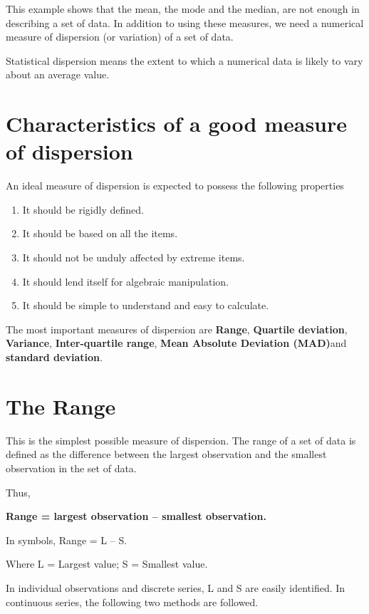 \documentclass[
]{book}
\begin{document}
This example shows that the mean, the mode and the median, are not
enough in describing a set of data. In addition to using these measures,
we need a numerical measure of dispersion (or variation) of a set of
data.

Statistical dispersion means the extent to which a numerical data is
likely to vary about an average value.

\section{Characteristics of a good measure of dispersion}\label{characteristics-of-a-good-measure-of-dispersion}

An ideal measure of dispersion is expected to possess the following
properties

\begin{enumerate}
\def\labelenumi{\arabic{enumi}.}
\item
  It should be rigidly defined.
\item
  It should be based on all the items.
\item
  It should not be unduly affected by extreme items.
\item
  It should lend itself for algebraic manipulation.
\item
  It should be simple to understand and easy to calculate.
\end{enumerate}

The most important measures of dispersion are \textbf{Range}, \textbf{Quartile
deviation}, \textbf{Variance}, \textbf{Inter-quartile range}, \textbf{Mean Absolute
Deviation (MAD)}and \textbf{standard deviation}.

\section{The Range}\label{the-range}

This is the simplest possible measure of dispersion. The range of a set
of data is defined as the difference between the largest observation and
the smallest observation in the set of data.

Thus,

\textbf{Range = largest observation -- smallest observation.}

In symbols, Range = L -- S.

Where L = Largest value; S = Smallest value.

In individual observations and discrete series, L and S are easily
identified. In continuous series, the following two methods are
followed.
\end{document}
